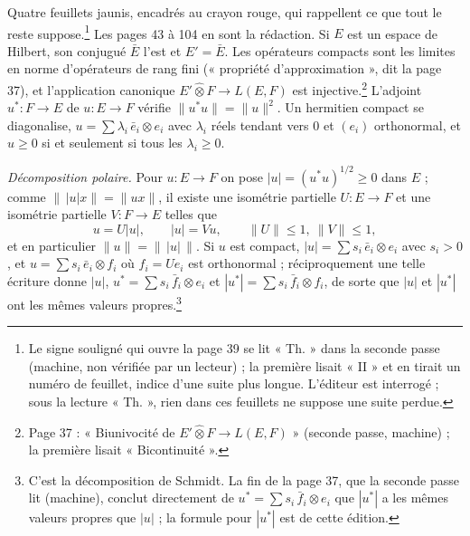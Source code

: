 \documentclass[11pt,a4paper]{article}
\begin{document}
Quatre feuillets jaunis, encadrés au crayon rouge, qui rappellent ce que
tout le reste suppose.\footnote{Le signe souligné qui ouvre la page 39 se
lit « Th. » dans la seconde passe (machine, non vérifiée par un lecteur) ;
la première lisait « II » et en tirait un numéro de feuillet, indice d'une
suite plus longue. L'éditeur est interrogé ; sous la lecture « Th. », rien
dans ces feuillets ne suppose une suite perdue.} Les pages 43 à 104 en sont
la rédaction. Si $E$ est un espace de Hilbert, son conjugué $\bar{E}$ l'est
et $E' = \bar{E}$. Les opérateurs compacts sont les limites en norme
d'opérateurs de rang fini (« propriété d'approximation », dit la page 37),
et l'application canonique $E' \mathbin{\hat\otimes} F \to L(E,F)$ est
injective.\footnote{Page 37 : « Biunivocité de $E' \hat\otimes F \to
L(E,F)$ » (seconde passe, machine) ; la première lisait « Bicontinuité ».} L'adjoint $u^{*} : F \to E$ de $u : E \to F$
vérifie $\|u^{*}u\| = \|u\|^2$. Un hermitien compact se diagonalise, $u =
\sum \lambda_i\, \bar{e}_i \otimes e_i$ avec $\lambda_i$ réels tendant vers
$0$ et $(e_i)$ orthonormal, et $u \geq 0$ si et seulement si tous les
$\lambda_i \geq 0$.

\emph{Décomposition polaire.} Pour $u : E \to F$ on pose $|u| =
(u^{*}u)^{1/2} \geq 0$ dans $E$ ; comme $\|\,|u|x\| = \|ux\|$, il existe une
isométrie partielle $U : E \to F$ et une isométrie partielle $V : F \to E$
telles que
\[
  u = U|u|, \qquad |u| = Vu, \qquad \|U\| \leq 1,\ \|V\| \leq 1,
\]
et en particulier $\|u\| = \|\,|u|\,\|$. Si $u$ est compact, $|u| = \sum
s_i\,\bar{e}_i \otimes e_i$ avec $s_i > 0$, et $u = \sum s_i\,\bar{e}_i
\otimes f_i$ où $f_i = Ue_i$ est orthonormal ; réciproquement une telle
écriture donne $|u|$, $u^{*} = \sum s_i\,\bar{f}_i \otimes e_i$ et
$|u^{*}| = \sum s_i\,\bar{f}_i \otimes f_i$, de sorte que $|u|$ et $|u^{*}|$
ont les mêmes valeurs propres.\footnote{C'est la décomposition de Schmidt.
La fin de la page 37, que la seconde passe lit (machine), conclut
directement de $u^{*} = \sum s_i\,\bar{f}_i \otimes e_i$ que $|u^{*}|$ a les
mêmes valeurs propres que $|u|$ ; la formule pour $|u^{*}|$ est de cette
édition.}
\end{document}
